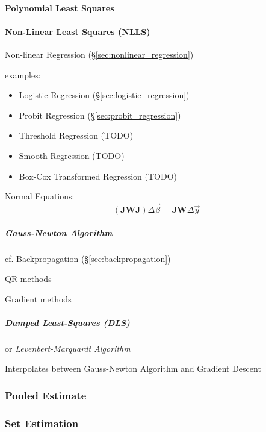 \paragraph{Polynomial Least Squares}\label{sec:polynomial_least_squares}\hfill

\paragraph{Non-Linear Least Squares (NLLS)}\label{sec:nlls}\hfill

Non-linear Regression (\S\ref{sec:nonlinear_regression})

examples:
\begin{itemize}
  \item Logistic Regression (\S\ref{sec:logistic_regression})
  \item Probit Regression (\S\ref{sec:probit_regression})
  \item Threshold Regression (TODO)
  \item Smooth Regression (TODO)
  \item Box-Cox Transformed Regression (TODO)
\end{itemize}

Normal Equations:
\[
  (\mathbf{J} \mathbf{W J}) \Delta \vec{\beta} =
    \mathbf{J} \mathbf{W} \Delta \vec{y}
\]



\subparagraph{Gauss-Newton Algorithm}\label{sec:gauss_newton}\hfill

cf. Backpropagation (\S\ref{sec:backpropagation})

QR methods

Gradient methods



\subparagraph{Damped Least-Squares (DLS)}\label{sec:dls}\hfill

or \emph{Levenbert-Marquardt Algorithm}

Interpolates between Gauss-Newton Algorithm and Gradient Descent



\subsubsection{Pooled Estimate}\label{sec:pooled_estimate}




\subsubsection{Set Estimation}\label{sec:set_estimation}

